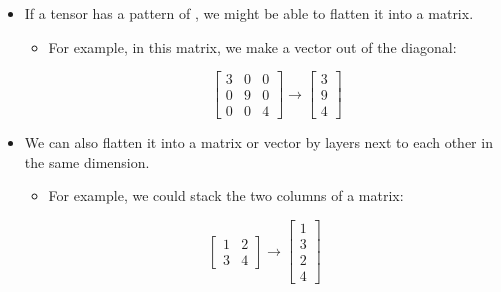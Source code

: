         \begin{itemize}
            \item If a tensor has a pattern of , we might be able to flatten it into a matrix.
                \begin{itemize}
                    \item For example, in this matrix, we make a vector out of the diagonal:
                    
                    \begin{equation}
                        \begin{bmatrix}
                            3 & 0 & 0\\
                            0 & 9 & 0\\
                            0 & 0 & 4
                        \end{bmatrix}
                        \rightarrow
                        \begin{bmatrix}
                            3\\9\\4
                        \end{bmatrix}
                    \end{equation}
                    
                \end{itemize}
                
            \item We can also flatten it into a matrix or vector by  layers next to each other in the same dimension.

                \begin{itemize}
                    \item For example, we could stack the two columns of a matrix:
                \end{itemize}

                \begin{equation}
                    \begin{bmatrix}
                        1 & 2 \\ 3 & 4
                    \end{bmatrix}
                    \rightarrow
                    \begin{bmatrix}
                        1 \\ 3 \\ 2 \\ 4
                    \end{bmatrix}
                \end{equation}
            

\end{itemize}
